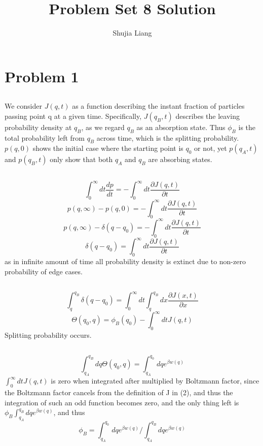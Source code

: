 \documentclass[11pt, oneside]{article}   	%
\title{Problem Set 8 Solution}
\author{Shujia Liang}
\begin{document}
\maketitle
\section{Problem 1}
\subsection{}
We consider $J(q, t)$ as a function describing the instant fraction of particles passing point q at a given time. Specifically, $J({q_B}, t)$ describes the leaving probability density at $q_B$, as we regard $q_B$ as an absorption state. Thus $\phi_B$ is the total probability left from $q_B$ across time, which is the splitting probability. $p(q, 0)$ shows the initial case where the starting point is $q_0$ or not, yet $p(q_A, t)$ and $p(q_B, t)$ only show that both $q_A$ and $q_B$ are absorbing states. 

\subsection{}
$$\int_{0}^{\infty} dt \frac{dp}{dt} = -\int_{0}^{\infty} dt \frac{\partial {J(q, t)}}{\partial t}$$
$$p(q, \infty)-p(q, 0) = -\int_{0}^{\infty} dt \frac{\partial {J(q, t)}}{\partial t}$$
$$p(q, \infty)-\delta (q-q_0) = -\int_{0}^{\infty} dt \frac{\partial {J(q, t)}}{\partial t}$$
$$\delta (q-q_0) = \int_{0}^{\infty} dt \frac{\partial {J(q, t)}}{\partial t}$$
as in infinite amount of time all probability density is extinct due to non-zero probability of edge cases.
\subsection{}
$$\int_{q}^{q_B}\delta (q-q_0) = \int_{0}^{\infty} dt \int_{q}^{q_B} dx \frac{\partial {J(x, t)}}{\partial x}$$
$$\Theta(q_0, q) = \phi_B(q_0)-\int_{0}^{\infty} dt J(q, t)$$
Splitting probability occurs.
\subsection{}
$$\int_{q_A}^{q_B} dq \Theta(q_0, q) = \int_{q_A}^{q_0} dq e^{\beta w(q)}$$
$\int_{0}^{\infty} dt J(q, t)$ is zero when integrated after multiplied by Boltzmann factor, since the Boltzmann factor cancels from the definition of J in (2), and thus the integration of such an odd function becomes zero, and the only thing left is $\phi_B \int_{q_A}^{q_B} dq e^{\beta w(q)}$, and thus $$\phi_B = \int_{q_A}^{q_0} dq e^{\beta w(q)} / \int_{q_A}^{q_B} dq e^{\beta w(q)}$$
\end{document}
